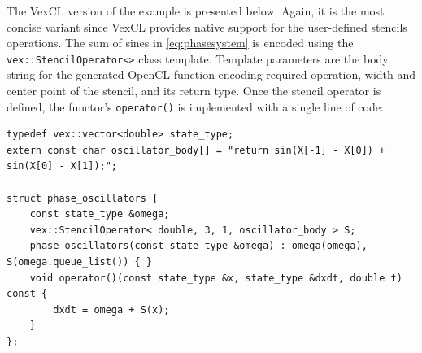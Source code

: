 \documentclass[1p]{elsarticle}
\newcommand{\code}[1]{\lstinline|#1|}
\begin{document}
The VexCL version of the example is presented below.  Again, it is the most
concise variant since VexCL provides native support for the user-defined
stencils operations. The sum of sines in \eqref{eq:phasesystem} is encoded
using the \code{vex::StencilOperator<>} class template.  Template parameters
are the body string for the generated OpenCL function encoding required
operation, width and center point of the stencil, and its return type. Once the
stencil operator is defined, the functor's \code{operator()} is implemented
with a single line of code:
\begin{lstlisting}
typedef vex::vector<double> state_type;
extern const char oscillator_body[] = "return sin(X[-1] - X[0]) + sin(X[0] - X[1]);";

struct phase_oscillators {
    const state_type &omega;
    vex::StencilOperator< double, 3, 1, oscillator_body > S;
    phase_oscillators(const state_type &omega) : omega(omega), S(omega.queue_list()) { }
    void operator()(const state_type &x, state_type &dxdt, double t) const {
        dxdt = omega + S(x);
    }
};
\end{lstlisting}
\end{document}
